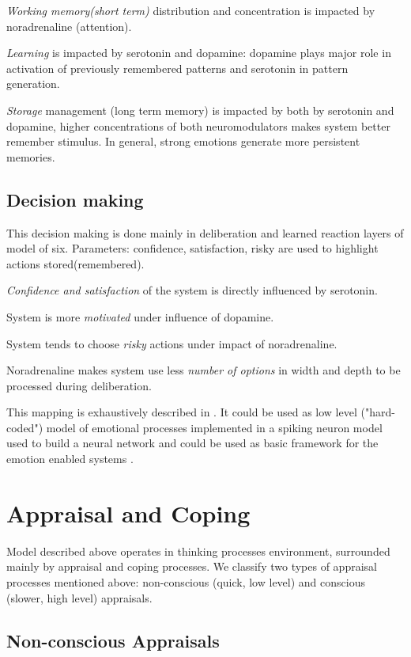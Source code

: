 \emph{Working memory(short term)} distribution and concentration is impacted by noradrenaline (attention).

\emph{Learning} is impacted by serotonin and dopamine: dopamine plays major role in activation of previously remembered patterns and serotonin in pattern generation.

\emph{Storage} management (long term memory) is impacted by both by serotonin and dopamine, higher concentrations of both neuromodulators makes system better remember stimulus. In general, strong emotions generate more persistent memories.

\subsection{Decision making}

This decision making is done mainly in deliberation and learned reaction layers of model of six.
Parameters: confidence, satisfaction, risky are used to highlight actions stored(remembered).

\emph{Confidence and satisfaction} of the system is directly influenced by serotonin.

System is more \emph{motivated} under influence of dopamine.

System tends to choose \emph{risky} actions under impact of noradrenaline.

Noradrenaline makes system use less \emph{number of options} in width and depth to be processed during deliberation.

This mapping is exhaustively described in \cite{computational_emotional_thinking}. It could be used as low level ("hard-coded") model of emotional processes implemented in a spiking neuron model used to build a neural network and could be used as basic framework for the emotion enabled systems \cite{whatdoesitmeanforcomputer}.

\section{Appraisal and Coping}

Model described above operates in thinking processes environment, surrounded mainly by appraisal and coping processes. We classify two types of appraisal processes mentioned above: non-conscious (quick, low level) and conscious (slower, high level) appraisals.

\subsection{Non-conscious Appraisals}

